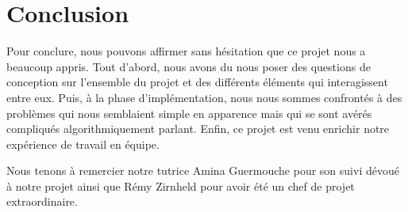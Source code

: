 \chapter*{Conclusion}

Pour conclure, nous pouvons affirmer sans hésitation que ce projet nous a beaucoup appris.
Tout d'abord, nous avons du nous poser des questions de conception sur l'ensemble du projet et des différents éléments qui interagissent entre eux.
Puis, à la phase d'implémentation, nous nous sommes confrontés à des problèmes qui nous semblaient simple en apparence mais qui se sont avérés compliqués algorithmiquement parlant.
Enfin, ce projet est venu enrichir notre expérience de travail en équipe.

Nous tenons à remercier notre tutrice Amina Guermouche pour son suivi dévoué à notre projet ainsi que Rémy Zirnheld pour avoir été un chef de projet extraordinaire.

